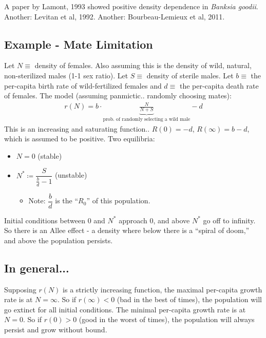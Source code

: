 \documentclass{article}
\begin{document}
        A paper by Lamont, 1993 showed positive density dependence in \emph{Banksia goodii}.  Another: Levitan et al, 1992.  Another: Bourbeau-Lemieux et al, 2011. \\

        \subsection{Example - Mate Limitation}
            Let $N \equiv$ density of females.  Also assuming this is the density of wild, natural, non-sterilized males (1-1 sex ratio).  Let $S \equiv$ density of sterile males.  Let $b \equiv$ the per-capita birth rate of wild-fertilized females and $d \equiv$ the per-capita death rate of females.  The model (assuming panmictic.. randomly choosing mates):
            \begin{align}
                r(N) = b\cdot\underbrace{\frac{N}{N + S}}_\text{prob. of randomly selecting a wild male} - d
            \end{align}
            This is an increasing and saturating function.. $R(0) = -d$, $R(\infty) = b - d$, which is assumed to be positive.  Two equilibria:
            \begin{itemize}
                \item $N = 0$ (stable)
                \item $N^* \coloneqq \dfrac{S}{\frac{b}{d} - 1}$ (unstable)
                \begin{itemize}
                    \item Note: $\dfrac{b}{d}$ is the ``$R_0$'' of this population.
                \end{itemize}
            \end{itemize}
            Initial conditions between $0$ and $N^*$ approach $0$, and above $N^*$ go off to infinity.  So there is an Allee effect - a density where below there is a ``spiral of doom,'' and above the population persists.

        \subsection{In general...}
            Supposing $r(N)$ is a strictly increasing function, the maximal per-capita growth rate is at $N = \infty$.  So if $r(\infty) < 0$ (bad in the best of times), the population will go extinct for all initial conditions.  The minimal per-capita growth rate is at $N = 0$.  So if $r(0) > 0$ (good in the worst of times), the population will always persist and grow without bound.
\end{document}
